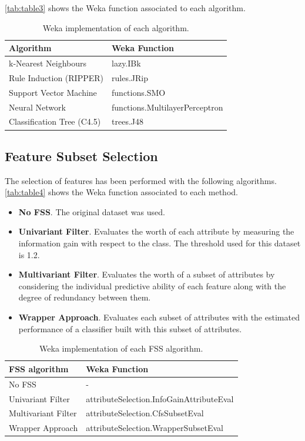 \documentclass[a4paper,11pt]{article}
\begin{document}
\autoref{tab:table3} shows the Weka function associated to each algorithm.

\begin{table}[h]
\centering
\begin{tabular}{||l|l||}
	\hline
	Algorithm & Weka Function\\
	\hline
	k-Nearest Neighbours & lazy.IBk\\
	Rule Induction (RIPPER) & rules.JRip\\
	Support Vector Machine & functions.SMO\\
	Neural Network & functions.MultilayerPerceptron\\
	Classification Tree (C4.5) & trees.J48\\
	\hline
\end{tabular}
\caption{Weka implementation of each algorithm.}
\label{tab:table3}
\end{table}

\subsection{Feature Subset Selection}
\label{subsec:fss}

The selection of features has been performed with the following algorithms. \autoref{tab:table4} shows the Weka function associated to each method.

\begin{itemize}
\setlength\itemsep{-1ex}
\item \textbf{No FSS}. The original dataset was used.
\item \textbf{Univariant Filter}. Evaluates the worth of each attribute by measuring the information gain with respect to the class. The threshold used for this dataset is 1.2.
\item \textbf{Multivariant Filter}. Evaluates the worth of a subset of attributes by considering the individual predictive ability of each feature along with the degree of redundancy between them.
\item \textbf{Wrapper Approach}. Evaluates each subset of attributes with the estimated performance of a classifier built with this subset of attributes.
\end{itemize}

\begin{table}[h]
\centering
\begin{tabular}{||l|l||}
	\hline
	FSS algorithm & Weka Function\\
	\hline
	No FSS & -\\
	Univariant Filter & attributeSelection.InfoGainAttributeEval\\
	Multivariant Filter & attributeSelection.CfsSubsetEval\\
	Wrapper Approach & attributeSelection.WrapperSubsetEval\\
	\hline
\end{tabular}
\caption{Weka implementation of each FSS algorithm.}
\label{tab:table4}
\end{table}
\end{document}
